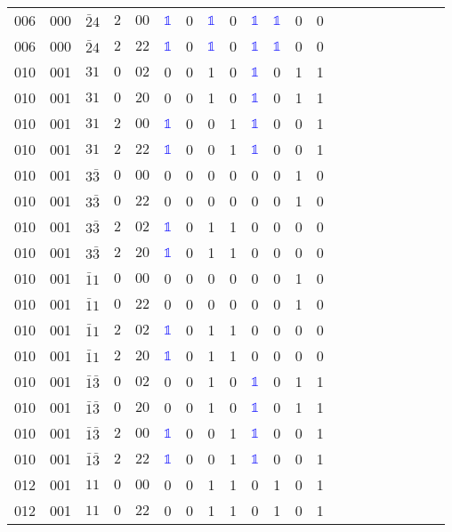 \begin{longtable*}{c| cccccccccccccccccccc }
006& 000& $\bar{2}4$& $2$& $00$& \textcolor{blue}{$\mathds{1}$}& 0& \textcolor{blue}{$\mathds{1}$}& 0& \textcolor{blue}{$\mathds{1}$}& \textcolor{blue}{$\mathds{1}$}& 0& 0\\
006& 000& $\bar{2}4$& $2$& $22$& \textcolor{blue}{$\mathds{1}$}& 0& \textcolor{blue}{$\mathds{1}$}& 0& \textcolor{blue}{$\mathds{1}$}& \textcolor{blue}{$\mathds{1}$}& 0& 0\\
010& 001& $31$& $0$& $02$& 0& 0& 1& 0& \textcolor{blue}{$\mathds{1}$}& 0& 1& 1\\
010& 001& $31$& $0$& $20$& 0& 0& 1& 0& \textcolor{blue}{$\mathds{1}$}& 0& 1& 1\\
010& 001& $31$& $2$& $00$& \textcolor{blue}{$\mathds{1}$}& 0& 0& 1& \textcolor{blue}{$\mathds{1}$}& 0& 0& 1\\
010& 001& $31$& $2$& $22$& \textcolor{blue}{$\mathds{1}$}& 0& 0& 1& \textcolor{blue}{$\mathds{1}$}& 0& 0& 1\\
010& 001& $3\bar{3}$& $0$& $00$& 0& 0& 0& 0& 0& 0& 1& 0\\
010& 001& $3\bar{3}$& $0$& $22$& 0& 0& 0& 0& 0& 0& 1& 0\\
010& 001& $3\bar{3}$& $2$& $02$& \textcolor{blue}{$\mathds{1}$}& 0& 1& 1& 0& 0& 0& 0\\
010& 001& $3\bar{3}$& $2$& $20$& \textcolor{blue}{$\mathds{1}$}& 0& 1& 1& 0& 0& 0& 0\\
010& 001& $\bar{1}1$& $0$& $00$& 0& 0& 0& 0& 0& 0& 1& 0\\
010& 001& $\bar{1}1$& $0$& $22$& 0& 0& 0& 0& 0& 0& 1& 0\\
010& 001& $\bar{1}1$& $2$& $02$& \textcolor{blue}{$\mathds{1}$}& 0& 1& 1& 0& 0& 0& 0\\
010& 001& $\bar{1}1$& $2$& $20$& \textcolor{blue}{$\mathds{1}$}& 0& 1& 1& 0& 0& 0& 0\\
010& 001& $\bar{1}\bar{3}$& $0$& $02$& 0& 0& 1& 0& \textcolor{blue}{$\mathds{1}$}& 0& 1& 1\\
010& 001& $\bar{1}\bar{3}$& $0$& $20$& 0& 0& 1& 0& \textcolor{blue}{$\mathds{1}$}& 0& 1& 1\\
010& 001& $\bar{1}\bar{3}$& $2$& $00$& \textcolor{blue}{$\mathds{1}$}& 0& 0& 1& \textcolor{blue}{$\mathds{1}$}& 0& 0& 1\\
010& 001& $\bar{1}\bar{3}$& $2$& $22$& \textcolor{blue}{$\mathds{1}$}& 0& 0& 1& \textcolor{blue}{$\mathds{1}$}& 0& 0& 1\\
012& 001& $11$& $0$& $00$& 0& 0& 1& 1& 0& 1& 0& 1\\
012& 001& $11$& $0$& $22$& 0& 0& 1& 1& 0& 1& 0& 1\\

\end{longtable*}
